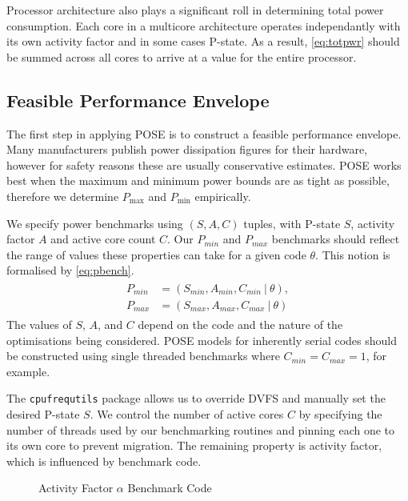 Processor architecture also plays a significant roll in determining total power consumption.
Each core in a multicore architecture operates independantly with its own activity factor and in some cases P-state.
As a result, \autoref{eq:totpwr} should be summed across all cores to arrive at a value for the entire processor.

\subsection{Feasible Performance Envelope}
The first step in applying POSE is to construct a feasible performance envelope.
Many manufacturers publish power dissipation figures for their hardware, however for safety reasons these are usually conservative estimates.
POSE works best when the maximum and minimum power bounds are as tight as possible, therefore we determine $P_{\max}$ and $P_{\min}$ empirically.

We specify power benchmarks using $(S,A,C)$ tuples, with P-state $S$, activity factor $A$ and active core count $C$.
Our $P_{min}$ and $P_{max}$ benchmarks should reflect the range of values these properties can take for a given code $\theta$.
This notion is formalised by \autoref{eq:pbench}.
\begin{align}
  \label{eq:pbench}
  \begin{split}
    P_{min} &= (S_{min}, A_{min}, C_{min}~\vert~\theta), \\
    P_{max} &= (S_{max}, A_{max}, C_{max}~\vert~\theta) 
  \end{split}
\end{align}
The values of $S$, $A$, and $C$ depend on the code and the nature of the optimisations being considered.
POSE models for inherently serial codes should be constructed using single threaded benchmarks where $C_{min} = C_{max} = 1$, for example.

The \texttt{cpufrequtils} package allows us to override DVFS and manually set the desired P-state $S$.
We control the number of active cores $C$ by specifying the number of threads used by our benchmarking routines and pinning each one to its own core to prevent migration.
The remaining property is activity factor, which is influenced by benchmark code.

\begin{figure}[ht]
\centering
\lstset{basicstyle=\ttfamily\footnotesize\bfseries, frame=tb} %

\caption{Activity Factor $\alpha$ Benchmark Code}
\label{fig:microbench}
\end{figure}

